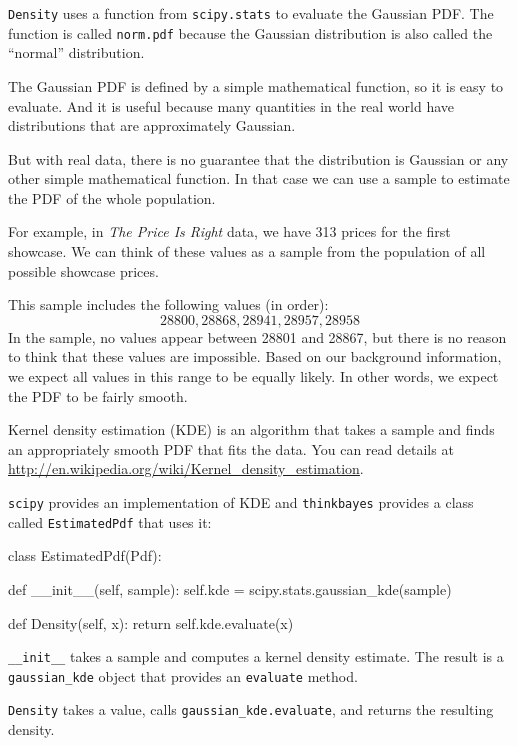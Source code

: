 \documentclass[12pt]{book}
\theoremstyle{exercise}
\begin{document}
{\tt Density} uses a function from {\tt scipy.stats} to evaluate the
Gaussian PDF.  The function is called {\tt norm.pdf} because the
Gaussian distribution is also called the ``normal'' distribution. 

The Gaussian PDF is defined by a simple mathematical function,
so it is easy to evaluate.  And it is useful because many
quantities in the real world have distributions that are
approximately Gaussian.

But with real data, there is no guarantee that the distribution
is Gaussian or any other simple mathematical function.  In
that case we can use a sample to estimate the PDF of
the whole population.

For example, in {\it The Price Is Right} data, we have
313 prices for the first showcase.  We can think of these
values as a sample from the population of all possible showcase
prices.

This sample includes the following values (in order):
%
\[ 28800, 28868, 28941, 28957, 28958 \]
%
In the sample, no values appear between 28801 and 28867, but
there is no reason to think that these values are impossible.
Based on our background information, we expect all
values in this range to be equally likely.  In other words,
we expect the PDF to be fairly smooth.

Kernel density estimation (KDE) is an algorithm that takes
a sample and finds an appropriately smooth PDF that fits 
the data.  You can read details at
\url{http://en.wikipedia.org/wiki/Kernel_density_estimation}.

{\tt scipy} provides an implementation of KDE and  {\tt thinkbayes}
provides a class called {\tt EstimatedPdf} that 
uses it:

\begin{code}
class EstimatedPdf(Pdf):

    def __init__(self, sample):
        self.kde = scipy.stats.gaussian_kde(sample)

    def Density(self, x):
        return self.kde.evaluate(x)
\end{code}

\verb"__init__" takes a sample
and computes a kernel density estimate.  The result is a
\verb"gaussian_kde" object that provides an {\tt evaluate}
method.

{\tt Density} takes a value, calls \verb"gaussian_kde.evaluate",
and returns the resulting density.
\end{document}
